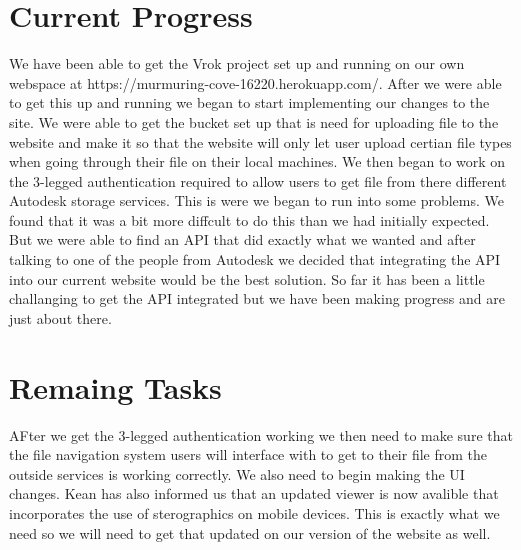 \documentclass[10pt,draftclsnofoot,onecolumn]{IEEEtran}
\begin{document}
\section{Current Progress}
We have been able to get the Vrok project set up and running on our own webspace at https://murmuring-cove-16220.herokuapp.com/. After we were able to get this up and running we began to start implementing our changes to the site. We were able to get the bucket set up that is need for uploading file to the website and make it so that the website will only let user upload certian file types when going through their file on their local machines. We then began to work on the 3-legged authentication required to allow users to get file from there different Autodesk storage services. This is were we began to run into some problems. We found that it was a bit more diffcult to do this than we had initially expected. But we were able to find an API that did exactly what we wanted and after talking to one of the people from Autodesk we decided that integrating the API into our current website would be the best solution. So far it has been a little challanging to get the API integrated but we have been making progress and are just about there.




\section{Remaing Tasks}
AFter we get the 3-legged authentication working we then need to make sure that the file navigation system users will interface with to get to their file from the outside services is working correctly. We also need to begin making the UI changes. Kean has also informed us that an updated viewer is now avalible that incorporates the use of sterographics on mobile devices. This is exactly what we need so we will need to get that updated on our version of the website as well. 
\end{document}

